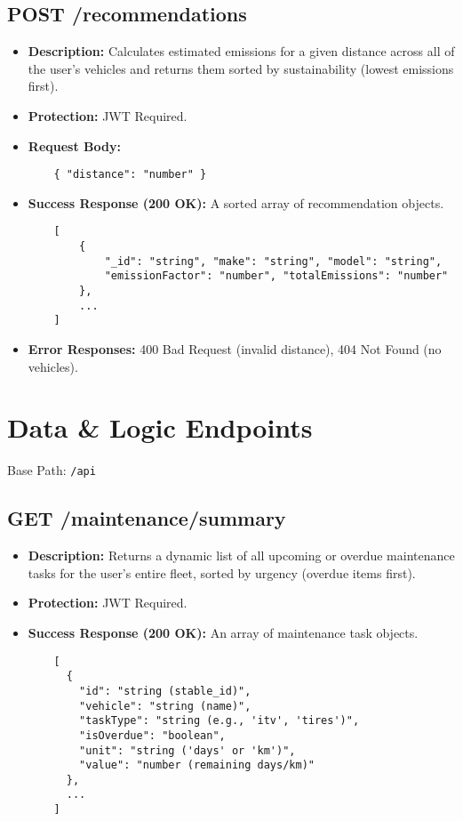 \subsection{POST /recommendations}
\begin{itemize}
    \item \textbf{Description:} Calculates estimated emissions for a given distance across all of the user's vehicles and returns them sorted by sustainability (lowest emissions first).
    \item \textbf{Protection:} JWT Required.
    \item \textbf{Request Body:}
    \begin{verbatim}
    { "distance": "number" }
    \end{verbatim}
    \item \textbf{Success Response (200 OK):} A sorted array of recommendation objects.
    \begin{verbatim}
    [
        {
            "_id": "string", "make": "string", "model": "string",
            "emissionFactor": "number", "totalEmissions": "number"
        },
        ...
    ]
    \end{verbatim}
    \item \textbf{Error Responses:} 400 Bad Request (invalid distance), 404 Not Found (no vehicles).
\end{itemize}


\section{Data \& Logic Endpoints}
Base Path: \texttt{/api}

\subsection{GET /maintenance/summary}
\begin{itemize}
    \item \textbf{Description:} Returns a dynamic list of all upcoming or overdue maintenance tasks for the user's entire fleet, sorted by urgency (overdue items first).
    \item \textbf{Protection:} JWT Required.
    \item \textbf{Success Response (200 OK):} An array of maintenance task objects.
    \begin{verbatim}
    [
      {
        "id": "string (stable_id)",
        "vehicle": "string (name)",
        "taskType": "string (e.g., 'itv', 'tires')",
        "isOverdue": "boolean",
        "unit": "string ('days' or 'km')",
        "value": "number (remaining days/km)"
      },
      ...
    ]
    \end{verbatim}
\end{itemize}

